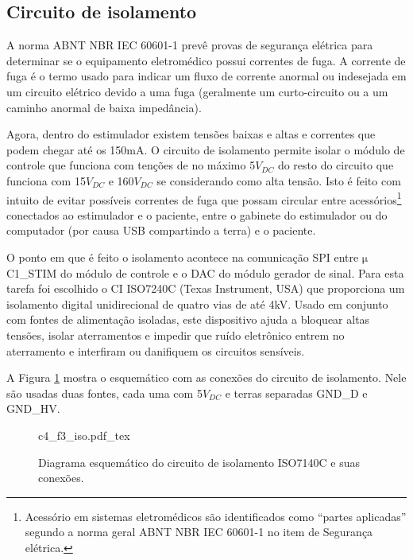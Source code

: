 \subsection*{Circuito de isolamento}
A norma \acrshort{ABNT} \acrshort{NBR} \acrshort{IEC} 60601-1 prevê provas de segurança elétrica para determinar se o equipamento eletromédico possui correntes de fuga. A corrente de fuga é o termo usado para indicar um fluxo de corrente anormal ou indesejada em um circuito elétrico devido a uma fuga (geralmente um curto-circuito ou a um caminho anormal de baixa impedância). 

Agora, dentro do estimulador existem tensões baixas e altas e correntes que podem chegar até os 150mA. O circuito de isolamento permite isolar o módulo de controle que funciona com tenções de no máximo 5$V_{DC}$ do resto do circuito que funciona com 15$V_{DC}$ e 160$V_{DC}$ se considerando como alta tensão. Isto é feito com intuito de evitar possíveis correntes de fuga que possam circular entre acessórios\footnote{Acessório em sistemas eletromédicos são identificados como “partes aplicadas” segundo a norma geral \acrshort{ABNT} \acrshort{NBR} \acrshort{IEC} 60601-1 no item de Segurança elétrica.}  conectados ao estimulador e o paciente, entre o gabinete do estimulador ou do computador (por causa \acrshort{USB} compartindo a terra) e o paciente. 

O ponto em que é feito o isolamento acontece na comunicação \acrshort{SPI} entre $\mathrm{\mu}$C1\_STIM do módulo de controle e o \acrshort{DAC} do módulo gerador de sinal. Para esta tarefa foi escolhido o \acrshort{CI} ISO7240C (Texas Instrument, USA) que proporciona um isolamento digital unidirecional de quatro vias de até 4kV. Usado em conjunto com fontes de alimentação isoladas, este dispositivo ajuda a bloquear altas tensões, isolar aterramentos e impedir que ruído eletrônico entrem no aterramento e interfiram ou danifiquem os circuitos sensíveis.

A Figura \ref{fig:c4_f3_iso} mostra o esquemático com as conexões do circuito de isolamento. Nele são usadas duas fontes, cada uma com 5$V_{DC}$ e terras separadas GND\_D e GND\_HV. 

\vspace{0.3cm}
\begin{figure}[h]
    \centering %
    \small %
    \def\svgwidth{0.7\columnwidth}%
    {c4_f3_iso.pdf_tex}
    \caption{Diagrama esquemático do circuito de isolamento ISO7140C e suas conexões.}
    \label{fig:c4_f3_iso}
\end{figure}

